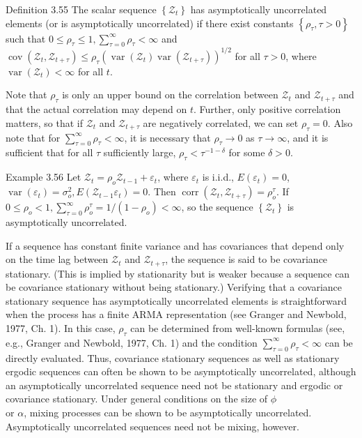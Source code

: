 \documentclass[10pt]{article}
\begin{document}
Definition 3.55 The scalar sequence $\left\{\mathcal{Z}_{t}\right\}$ has asymptotically uncorrelated elements (or is asymptotically uncorrelated) if there exist constants $\left\{\rho_{\tau}, \tau>0\right\}$ such that $0 \leq \rho_{\tau} \leq 1, \sum_{\tau=0}^{\infty} \rho_{\tau}<\infty$ and $\operatorname{cov}\left(\mathcal{Z}_{t}, \mathcal{Z}_{t+\tau}\right) \leq \rho_{\tau}\left(\operatorname{var}\left(\mathcal{Z}_{t}\right) \operatorname{var}\left(\mathcal{Z}_{t+\tau}\right)\right)^{1 / 2}$ for all $\tau>0$, where $\operatorname{var}\left(\mathcal{Z}_{t}\right)<\infty$ for all $t$.

Note that $\rho_{\tau}$ is only an upper bound on the correlation between $\mathcal{Z}_{t}$ and $\mathcal{Z}_{t+\tau}$ and that the actual correlation may depend on $t$. Further, only positive correlation matters, so that if $\mathcal{Z}_{t}$ and $\mathcal{Z}_{t+\tau}$ are negatively correlated, we can set $\rho_{\tau}=0$. Also note that for $\sum_{\tau=0}^{\infty} \rho_{\tau}<\infty$, it is necessary that $\rho_{\tau} \rightarrow 0$ as $\tau \rightarrow \infty$, and it is sufficient that for all $\tau$ sufficiently large, $\rho_{\tau}<\tau^{-1-\delta}$ for some $\delta>0$.

Example 3.56 Let $\mathcal{Z}_{t}=\rho_{o} \mathcal{Z}_{t-1}+\varepsilon_{t}$, where $\varepsilon_{t}$ is i.i.d., $E\left(\varepsilon_{t}\right)=0$, $\operatorname{var}\left(\varepsilon_{t}\right) =\sigma_{o}^{2}, E\left(\mathcal{Z}_{t-1} \varepsilon_{t}\right)=0$. Then $\operatorname{corr}\left(\mathcal{Z}_{t}, \mathcal{Z}_{t+\tau}\right)=\rho_{o}^{\tau}$. If $0 \leq \rho_{o}<1, \sum_{\tau=0}^{\infty} \rho_{o}^{\tau}= 1 /\left(1-\rho_{o}\right)<\infty$, so the sequence $\left\{\mathcal{Z}_{t}\right\}$ is asymptotically uncorrelated.

If a sequence has constant finite variance and has covariances that depend only on the time lag between $\mathcal{Z}_{t}$ and $\mathcal{Z}_{t+\tau}$, the sequence is said to be covariance stationary. (This is implied by stationarity but is weaker because a sequence can be covariance stationary without being stationary.) Verifying that a covariance stationary sequence has asymptotically uncorrelated elements is straightforward when the process has a finite ARMA representation (see Granger and Newbold, 1977, Ch. 1). In this case, $\rho_{\tau}$ can be determined from well-known formulas (see, e.g., Granger and Newbold, 1977, Ch. 1) and the condition $\sum_{\tau=0}^{\infty} \rho_{\tau}<\infty$ can be directly evaluated. Thus, covariance stationary sequences as well as stationary ergodic sequences can often be shown to be asymptotically uncorrelated, although an asymptotically uncorrelated sequence need not be stationary and ergodic or covariance stationary. Under general conditions on the size of $\phi$\\
or $\alpha$, mixing processes can be shown to be asymptotically uncorrelated. Asymptotically uncorrelated sequences need not be mixing, however.
\end{document}

